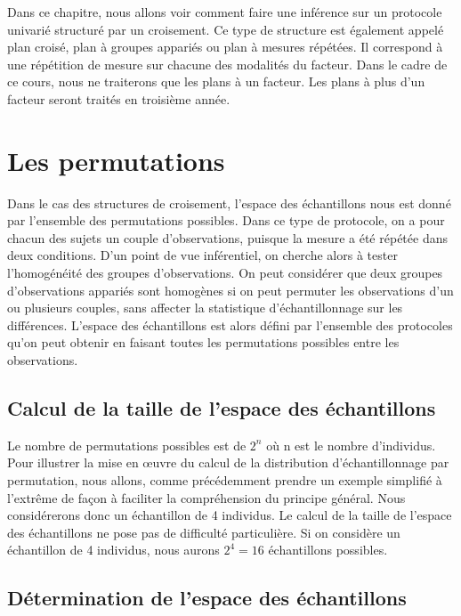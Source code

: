 \documentclass[]{book}
\theoremstyle{definition}
\theoremstyle{definition}
\theoremstyle{definition}
\theoremstyle{remark}
\begin{document}
Dans ce chapitre, nous allons voir comment faire une inférence sur un
protocole univarié structuré par un croisement. Ce type de structure est
également appelé plan croisé, plan à groupes appariés ou plan à mesures
répétées. Il correspond à une répétition de mesure sur chacune des
modalités du facteur. Dans le cadre de ce cours, nous ne traiterons que
les plans à un facteur. Les plans à plus d'un facteur seront traités en
troisième année.

\hypertarget{les-permutations}{%
\section{Les permutations}\label{les-permutations}}

Dans le cas des structures de croisement, l'espace des échantillons nous
est donné par l'ensemble des permutations possibles. Dans ce type de
protocole, on a pour chacun des sujets un couple d'observations, puisque
la mesure a été répétée dans deux conditions. D'un point de vue
inférentiel, on cherche alors à tester l'homogénéité des groupes
d'observations. On peut considérer que deux groupes d'observations
appariés sont homogènes si on peut permuter les observations d'un ou
plusieurs couples, sans affecter la statistique d'échantillonnage sur
les différences. L'espace des échantillons est alors défini par
l'ensemble des protocoles qu'on peut obtenir en faisant toutes les
permutations possibles entre les observations.

\hypertarget{calcul-de-la-taille-de-lespace-des-echantillons-1}{%
\subsection{Calcul de la taille de l'espace des
échantillons}\label{calcul-de-la-taille-de-lespace-des-echantillons-1}}

Le nombre de permutations possibles est de \(2^{n}\) où n est le nombre
d'individus. Pour illustrer la mise en œuvre du calcul de la
distribution d'échantillonnage par permutation, nous allons, comme
précédemment prendre un exemple simplifié à l'extrême de façon à
faciliter la compréhension du principe général. Nous considérerons donc
un échantillon de 4 individus. Le calcul de la taille de l'espace des
échantillons ne pose pas de difficulté particulière. Si on considère un
échantillon de 4 individus, nous aurons \(2^{4}=16\) échantillons
possibles.

\hypertarget{determination-de-lespace-des-echantillons-1}{%
\subsection{Détermination de l'espace des
échantillons}\label{determination-de-lespace-des-echantillons-1}}
\end{document}
